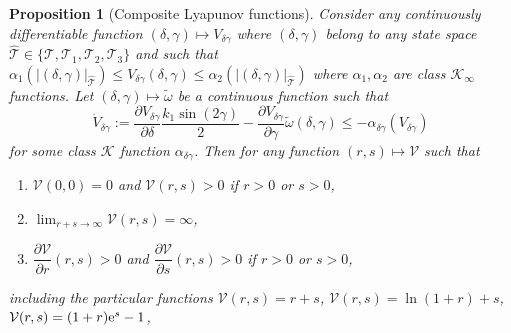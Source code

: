 \documentclass[letterpaper, 10 pt, conference]{ieeeconf}  %
\newtheorem{proposition}{Proposition}
\begin{document}
\begin{proposition}[{Composite Lyapunov functions}] 
\label{prop:composite_Lyap_function}
Consider 
any continuously differentiable function $(\delta,\gamma) \mapsto V_{\delta\gamma}$ where $(\delta,\gamma)$ belong to any state space $\hat{\mathcal{T}}\in\{\mathcal{T},\mathcal{T}_1,\mathcal{T}_2,\mathcal{T}_3\}$
and  such that 
$ \alpha_1(|(\delta, \gamma)|_{\hat{\mathcal{T}}}) \le V_{\delta\gamma}(\delta,\gamma) \le \alpha_2(|(\delta, \gamma)|_{\hat{\mathcal{T}}})$ where $\alpha_1, \alpha_2$ are class $\mathcal{K}_{\infty}$ functions. 
Let $(\delta,\gamma) \mapsto\tilde\omega$ be a continuous function such that 
\begin{equation}
\dot V_{\delta\gamma} := \dfrac{\partial V_{\delta\gamma}}{\partial\delta}
\frac{k_1\sin(2\gamma)}{2}  -\dfrac{\partial V_{\delta\gamma}}{\partial\gamma}\tilde\omega(\delta,\gamma) \leq -\alpha_{\delta\gamma}(V_{\delta\gamma}) \label{eq:V_dot_delta_gamma}
\end{equation}
for some class $\mathcal{K}$ function $\alpha_{\delta\gamma}$. 
Then for {\em any} function $(r,s) \mapsto \mathcal{V}$ such that 
\begin{enumerate}
\item $\mathcal{V}(0,0)=0$ and $\mathcal{V}(r, s)>0$ if $r > 0 $ or $s > 0$, \label{it:pos_def_composite_Lyap_function} 
\item $\lim_{r+s\rightarrow\infty} \mathcal{V}(r,s) = \infty$,
\item $\dfrac{\partial \mathcal{V} }{\partial r }(r,s)>0$ and $\dfrac{\partial \mathcal{V} }{\partial s}(r,s)>0$  if $r>0$ or $s > 0$, \label{it:positive_partials}
\end{enumerate}
including the particular functions
 $\mathcal{V}(r,s)= r+s$, $\mathcal{V}(r,s)= \ln(1+r) + s$, $\mathcal{V}(r,s)= (1+r){\rm e}^{s} -1$,  

\end{proposition}
\end{document}

